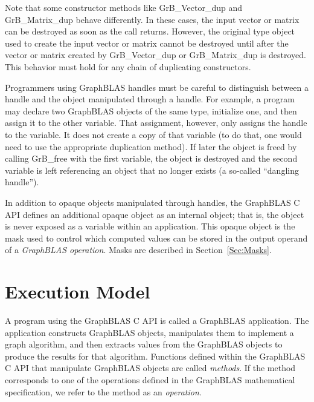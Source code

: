 Note that some constructor methods like {\sf GrB\_Vector\_dup} and 
{\sf GrB\_Matrix\_dup} behave differently. In these cases, the input 
vector or matrix can
be destroyed as soon as the call returns. However, the original type
object used to create the input vector or matrix cannot be destroyed
until after the vector or matrix created by {\sf GrB\_Vector\_dup} or
{\sf GrB\_Matrix\_dup} is destroyed.  This behavior must hold for any
chain of duplicating constructors.

Programmers using GraphBLAS handles must be careful to distinguish between a 
handle and the object manipulated through a handle.  For example, a program may 
declare two GraphBLAS objects of the same type, initialize one, and then assign 
it to the other variable.  That assignment, however, only assigns the handle to 
the variable.  It does not create a copy of that variable (to do that, one 
would need to use the appropriate duplication method).  If later the object is 
freed by calling {\sf GrB\_free} with the first variable, the object is 
destroyed and the second variable is left referencing an object that no longer 
exists (a so-called ``dangling handle'').

In addition to opaque objects manipulated through handles, the GraphBLAS C API 
defines an additional opaque object as an internal object; that is, the object 
is never exposed as a variable within an application.  This opaque object is 
the mask used to control which computed values can be stored in the output 
operand of a \emph{GraphBLAS operation}.  Masks are described in 
Section~\ref{Sec:Masks}.


\section{Execution Model}
\label{Sec:ExecutionModel}

A program using the GraphBLAS C API is called
a GraphBLAS application.  The application constructs GraphBLAS objects,
manipulates them to implement a graph algorithm, and then extracts
values from the GraphBLAS objects to produce the results for that algorithm. 
Functions defined within the GraphBLAS C API that manipulate GraphBLAS
objects are called \emph{methods}.  If the method corresponds to one
of the operations defined in the GraphBLAS mathematical specification,
we refer to the method as an \emph{operation}.

